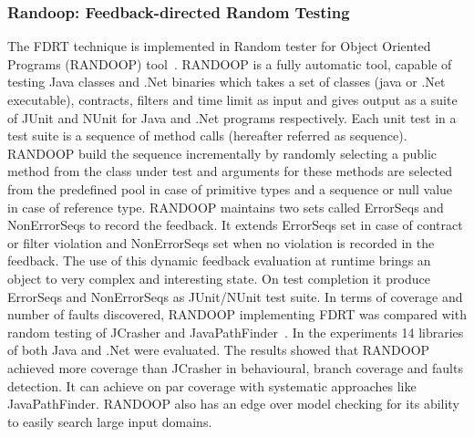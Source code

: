 {\subsubsection{Randoop: Feedback-directed Random Testing}
The FDRT technique is implemented in Random tester for Object Oriented Programs (RANDOOP) tool~\cite{Pacheco2007b}. RANDOOP is a fully automatic tool, capable of testing Java classes and .Net binaries which takes a set of classes (java or .Net executable), contracts, filters and time limit as input and gives output as a suite of JUnit and NUnit for Java and .Net programs respectively. Each unit test in a test suite is a sequence of method calls (hereafter referred as sequence). RANDOOP build the sequence incrementally by randomly selecting a public method from the class under test and arguments for these methods are selected from the predefined pool in case of primitive types and a sequence or null value in case of reference type. RANDOOP maintains two sets called ErrorSeqs and NonErrorSeqs to record the feedback. It extends ErrorSeqs set in case of contract or filter violation and NonErrorSeqs set when no violation is recorded in the feedback. The use of this dynamic feedback evaluation at runtime brings an object to very complex and interesting state. On test completion it produce ErrorSeqs and NonErrorSeqs as JUnit/NUnit test suite. In terms of coverage and number of faults discovered, RANDOOP implementing FDRT was compared with random testing of JCrasher and JavaPathFinder~\cite{visser2004test}. In the experiments 14 libraries of both Java and .Net were evaluated. The results showed that RANDOOP achieved more coverage than JCrasher in behavioural, branch coverage and faults detection. It can achieve on par coverage with systematic approaches like JavaPathFinder. RANDOOP also has an edge over model checking for its ability to easily search large input domains.



}
